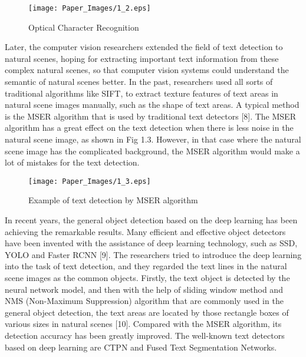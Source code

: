 \documentclass[22pt, UTF8]{article}
\numberwithin{figure}{section}
\numberwithin{table}{section}
\numberwithin{equation}{section} %
\begin{document}
\begin{figure}[htbp]
    \begin{center}
        \texttt{[image: Paper\_Images/1\_2.eps]}
    \end{center}
    \vspace{-3mm} %
    \caption{Optical Character Recognition}
    \vspace{-4mm} %
\end{figure}

\setlength\parindent{2em} Later, the computer vision researchers extended the field of text detection to natural scenes, hoping for extracting important text information from these complex natural scenes, so that computer vision systems could understand the semantic of natural scenes better. In the past, researchers used all sorts of traditional algorithms like SIFT, to extract texture features of text areas in natural scene images manually, such as the shape of text areas. A typical method is the MSER algorithm that is used by traditional text detectors [8]. The MSER algorithm has a great effect on the text detection when there is less noise in the natural scene image, as shown in Fig 1.3. However, in that case where the natural scene image has the complicated background, the MSER algorithm would make a lot of mistakes for the text detection.

\begin{figure}[htbp]
    \begin{center}
        \texttt{[image: Paper\_Images/1\_3.eps]}
    \end{center}
    \vspace{-3mm} %
    \caption{Example of text detection by MSER algorithm}
    \vspace{-4mm} %
\end{figure}

\setlength\parindent{2em} In recent years, the general object detection based on the deep learning has been achieving the remarkable results. Many efficient and effective object detectors have been invented with the assistance of deep learning technology, such as SSD, YOLO and Faster RCNN [9]. The researchers tried to introduce the deep learning into the task of text detection, and they regarded the text lines in the natural scene images as the common objects. Firstly, the text object is detected by the neural network model, and then with the help of sliding window method and NMS (Non-Maximum Suppression) algorithm that are commonly used in the general object detection, the text areas are located by those rectangle boxes of various sizes in natural scenes [10]. Compared with the MSER algorithm, its detection accuracy has been greatly improved. The well-known text detectors based on deep learning are CTPN and Fused Text Segmentation Networks.
\end{document}
